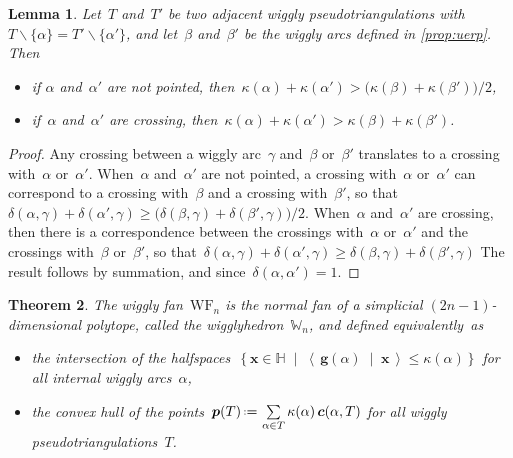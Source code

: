 \documentclass{amsart}
\newtheorem{theorem}{Theorem}%
\newtheorem{lemma}[theorem]{Lemma}
\theoremstyle{definition}
\newcommand{\HH}{\mathbb{H}} %
\renewcommand{\b}[1]{{\boldsymbol{#1}}} %
\newcommand{\set}[2]{\left\{ #1 \;\middle|\; #2 \right\}} %
\newcommand{\ssm}{\smallsetminus} %
\newcommand{\dotprod}[2]{\left\langle \, #1 \; \middle| \; #2 \, \right\rangle} %
\newcommand{\eqdef}{\mbox{\,\raisebox{0.2ex}{\scriptsize\ensuremath{\mathrm:}}\ensuremath{=}\,}} %
\newcommand{\darkblue}{\color{darkblue}} %
\newcommand{\defn}[1]{\textsl{\darkblue #1}} %
\newcommand{\polytope}[1]{\mathds{#1}} %
\newcommand{\wigglyFan}{\mathrm{WF}} %
\newcommand{\wigglyhedron}{\polytope{W}} %
\begin{document}
\begin{lemma}
\label{lem:wallCrossingInequalities}
Let~$T$ and~$T'$ be two adjacent wiggly pseudotriangulations with~$T \ssm \{\alpha\} = T' \ssm \{\alpha'\}$, and let~$\beta$ and~$\beta'$ be the wiggly arcs defined in \cref{prop:uerp}.
Then
\begin{itemize}
\item if $\alpha$ and~$\alpha'$ are not pointed, then~$\kappa(\alpha) + \kappa(\alpha') > \big( \kappa(\beta) + \kappa(\beta') \big) / 2$,
\item if~$\alpha$ and~$\alpha'$ are crossing, then~${\kappa(\alpha) + \kappa(\alpha') > \kappa(\beta) + \kappa(\beta')}$.
\end{itemize}
\end{lemma}

\begin{proof}
Any crossing between a wiggly arc~$\gamma$ and~$\beta$ or~$\beta'$ translates to a crossing with~$\alpha$ or~$\alpha'$.
When~$\alpha$ and~$\alpha'$ are not pointed, a crossing with~$\alpha$ or~$\alpha'$ can correspond to a crossing with~$\beta$ and a crossing with~$\beta'$, so that~$\delta(\alpha, \gamma) + \delta(\alpha', \gamma) \ge \big( \delta(\beta, \gamma) + \delta(\beta', \gamma) \big) / 2$.
When~$\alpha$ and~$\alpha'$ are crossing, then there is a correspondence between the crossings with~$\alpha$ or~$\alpha'$ and the crossings with~$\beta$ or~$\beta'$, so that~$\delta(\alpha, \gamma) + \delta(\alpha', \gamma) \ge \delta(\beta, \gamma) + \delta(\beta', \gamma)$
The result follows by summation, and since~$\delta(\alpha, \alpha') = 1$.
\end{proof}

\pagebreak
\begin{theorem}
\label{thm:wigglyhedron}
The wiggly fan~$\wigglyFan_n$ is the normal fan of a simplicial $(2n-1)$-dimensional polytope, called the \defn{wigglyhedron}~$\wigglyhedron_n$, and defined equivalently~as
\begin{itemize}
\item the intersection of the halfspaces~$\set{\b{x} \in \HH}{\dotprod{\b{g}(\alpha)}{\b{x}} \le \kappa(\alpha)}$ for all internal wiggly arcs~$\alpha$,
\item the convex hull of the points~$\b{p}(T) \eqdef \sum\limits_{\alpha \in T} \kappa(\alpha) \, \b{c}(\alpha, T)$ for all wiggly pseudotriangulations~$T$.
\end{itemize}
\end{theorem}
\end{document}
